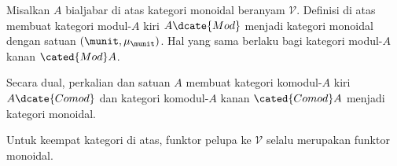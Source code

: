 \begin{proposition}\label{prop:bialgebra-Mod-monoidal}
	Misalkan $A$ bialjabar di atas kategori monoidal beranyam $\mathcal{V}$.
	Definisi di atas membuat kategori modul-$A$ kiri $A\dcate{Mod}$ menjadi
	kategori monoidal dengan satuan $(\munit,\mu_{\munit})$. Hal yang sama
	berlaku bagi kategori modul-$A$ kanan $\cated{Mod}A$.

	Secara dual, perkalian dan satuan $A$ membuat kategori komodul-$A$ kiri
	$A\dcate{Comod}$ dan kategori komodul-$A$ kanan $\cated{Comod}A$ menjadi
	kategori monoidal.

	Untuk keempat kategori di atas, funktor pelupa ke $\mathcal{V}$ selalu
	merupakan funktor monoidal.
\end{proposition}
